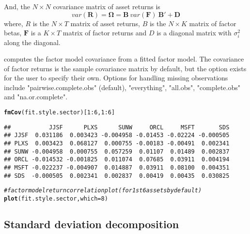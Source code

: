\documentclass[a4paper]{article}\usepackage[]{graphicx}\usepackage[]{color}
\makeatletter
\newcommand{\hlnum}[1]{\textcolor[rgb]{0.686,0.059,0.569}{#1}}%
\newcommand{\hlcom}[1]{\textcolor[rgb]{0.678,0.584,0.686}{\textit{#1}}}%
\newcommand{\hlopt}[1]{\textcolor[rgb]{0,0,0}{#1}}%
\newcommand{\hlstd}[1]{\textcolor[rgb]{0.345,0.345,0.345}{#1}}%
\newcommand{\hlkwc}[1]{\textcolor[rgb]{0.333,0.667,0.333}{#1}}%
\newcommand{\hlkwd}[1]{\textcolor[rgb]{0.737,0.353,0.396}{\textbf{#1}}}%
\newenvironment{kframe}{%
 \def\at@end@of@kframe{}%
 \ifinner\ifhmode%
  \def\at@end@of@kframe{\end{minipage}}%
  \begin{minipage}{\columnwidth}%
 \fi\fi%
 \def\FrameCommand##1{\hskip\@totalleftmargin \hskip-\fboxsep
 \colorbox{shadecolor}{##1}\hskip-\fboxsep
     \hskip-\linewidth \hskip-\@totalleftmargin \hskip\columnwidth}%
 \MakeFramed {\advance\hsize-\width
   \@totalleftmargin\z@ \linewidth\hsize
   \@setminipage}}%
 {\par\unskip\endMakeFramed%
 \at@end@of@kframe}
\newenvironment{knitrout}{}{} %
\makeatother
\begin{document}
And, the $N \times N$ covariance matrix of asset returns is
\begin{equation}
var(\mathbf{R}) = \bm\Omega = \mathbf{B}\: var(\mathbf{F})\: \mathbf{B}' + \mathbf{D}
\end{equation}
where, $R$ is the $N \times T$ matrix of asset returns, $B$ is the $N \times K$ matrix of factor betas, $\mathbf{F}$ is a $K \times T$ matrix of factor returns and $D$ is a diagonal matrix with $\sigma_i^2$ along the diagonal.

 computes the factor model covariance from a fitted factor model. The covariance of factor returns is the sample covariance matrix by default, but the option exists for the user to specify their own. Options for handling missing observations include "pairwise.complete.obs" (default), "everything", "all.obs", "complete.obs" and "na.or.complete".

\begin{knitrout}
\color{fgcolor}\begin{kframe}
\begin{alltt}
\hlkwd{fmCov}\hlstd{(fit.style.sector)[}\hlnum{1}\hlopt{:}\hlnum{6}\hlstd{,}\hlnum{1}\hlopt{:}\hlnum{6}\hlstd{]}
\end{alltt}
\begin{verbatim}
##           JJSF      PLXS      SUNW     ORCL     MSFT       SDS
## JJSF  0.031186  0.003423 -0.004958 -0.01453 -0.02224 -0.000505
## PLXS  0.003423  0.068127  0.000755 -0.00183 -0.00491  0.002341
## SUNW -0.004958  0.000755  0.057259  0.01107  0.01489  0.002837
## ORCL -0.014532 -0.001825  0.011074  0.07685  0.03911  0.004194
## MSFT -0.022237 -0.004907  0.014887  0.03911  0.08100  0.004351
## SDS  -0.000505  0.002341  0.002837  0.00419  0.00435  0.030825
\end{verbatim}
\begin{alltt}
\hlcom{# factor model return correlation plot (for 1st 6 assets by default)}
\hlkwd{plot}\hlstd{(fit.style.sector,} \hlkwc{which}\hlstd{=}\hlnum{8}\hlstd{)}
\end{alltt}


{\ttfamily\noindent\bfseries\color{errorcolor}{\#\# Error in xy.coords(x, y, xlabel, ylabel, log): 'x' is a list, but does not have components 'x' and 'y'}}\end{kframe}
\end{knitrout}

\subsection{Standard deviation decomposition}
\end{document}
